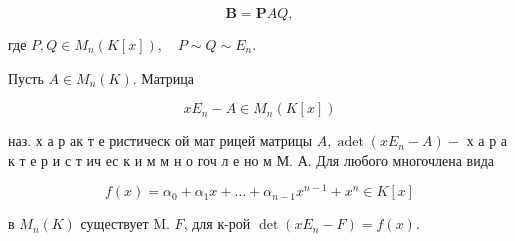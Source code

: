 \documentclass[10pt]{article}
\begin{document}
\[

\boldsymbol{B}=\boldsymbol{P} A Q,

\]



где $P, Q \in M_{n}(K[x]), \quad P \sim Q \sim E_{n}$.



Пусть $A \in M_{n}(K)$. Матрица



\[

x E_{n}-A \in M_{n}(K[x])

\]



наз. х а р ак т е ристическ ой мат рицей матрицы $A, \operatorname{adet}\left(x E_{n}-A\right)-$ х а р а к т е р и с т ич ес к и м м н о гоч л е но м М. А. Для любого многочлена вида



\[

f(x)=\alpha_{0}+\alpha_{1} x+\ldots+\alpha_{n-1} x^{n-1}+x^{n} \in K[x]

\]



в $M_{n}(K)$ существует M. $F$, для к-рой $\operatorname{det}\left(x E_{n}-F\right)=f(x)$.
\end{document}
